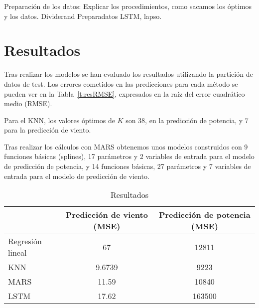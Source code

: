 \documentclass[journal]{IEEEtran}
\begin{document}
Preparación de los datos:
Explicar los procedimientos, como sacamos los óptimos y los datos.
Dividerand
Preparadatos LSTM, lapso.
%
%

\section{Resultados} 
Tras realizar los modelos se han evaluado los resultados utilizando la partición de datos de test. Los errores cometidos en las predicciones para cada método se pueden ver en la Tabla~\ref{t:resRMSE}, expresados en la raíz del error cuadrático medio (RMSE).

Para el KNN, los valores óptimos de $K$ son $38$, en la predicción de potencia, y $7$ para la predicción de viento.

Tras realizar los cálculos con MARS obtenemos unos modelos construidos con 9 funciones básicas (splines), 17 parámetros  y 2 variables de entrada para el modelo de predicción de potencia, y 14 funciones básicas, 27 parámetros y 7 variables de entrada para el modelo de predicción de viento.


\begin{table}[ht]
\centering
\caption{Resultados}\label{t:res}
\begin{tabular}{|l|c|c|}
\hline
& Predicción de viento (MSE) & Predicción de potencia (MSE)\\ \hline
Regresión lineal & 67 & 12811 \\ \hline
KNN & 9.6739 & 9223 \\ \hline
MARS & 11.59 & 10840 \\ \hline
LSTM & 17.62 & 163500 \\ \hline
\end{tabular}
\end{table}
\end{document}
